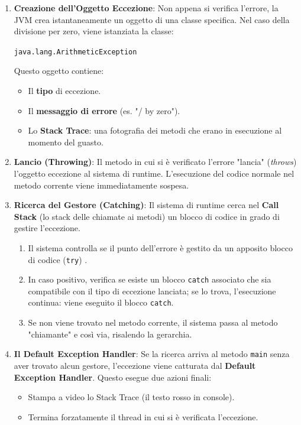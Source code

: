 \begin{enumerate}
    \item \textbf{Creazione dell'Oggetto Eccezione}: Non appena si verifica l'errore, la JVM crea istantaneamente un oggetto di una classe specifica. Nel caso della divisione per zero, viene istanziata la classe:
    \begin{center}
        \texttt{java.lang.ArithmeticException}
    \end{center}
    Questo oggetto contiene:
    \begin{itemize}
        \item Il \textbf{tipo} di eccezione.
        \item Il \textbf{messaggio di errore} (es. "/ by zero").
        \item Lo \textbf{Stack Trace}: una fotografia dei metodi che erano in esecuzione al momento del guasto.
    \end{itemize}
    \item \textbf{Lancio (Throwing)}: Il metodo in cui si è verificato l'errore "lancia" (\textit{throws}) l'oggetto eccezione al sistema di runtime. L'esecuzione del codice normale nel metodo corrente viene immediatamente sospesa.
    \item \textbf{Ricerca del Gestore (Catching)}: Il sistema di runtime cerca nel \textbf{Call Stack} (lo stack delle chiamate ai metodi) un blocco di codice in grado di gestire l'eccezione.
    \begin{enumerate}
        \item Il sistema controlla se il punto dell'errore è gestito da un apposito blocco di codice (\texttt{try}) .
        \item In caso positivo, verifica se esiste un blocco \texttt{catch} associato che sia compatibile con il tipo di eccezione lanciata; se lo trova, l'esecuzione continua: viene eseguito il blocco \texttt{catch}.
        \item Se non viene trovato nel metodo corrente, il sistema passa al metodo "chiamante" e così via, risalendo la gerarchia.
    \end{enumerate}
    \item \textbf{Il Default Exception Handler}: Se la ricerca arriva al metodo \texttt{main} senza aver trovato alcun gestore, l'eccezione viene catturata dal \textbf{Default Exception Handler}. Questo esegue due azioni finali:
    \begin{itemize}
        \item Stampa a video lo Stack Trace (il testo rosso in console).
        \item Termina forzatamente il thread in cui si è verificata l'eccezione.
    \end{itemize}
\end{enumerate}
\vspace{\baselineskip}


